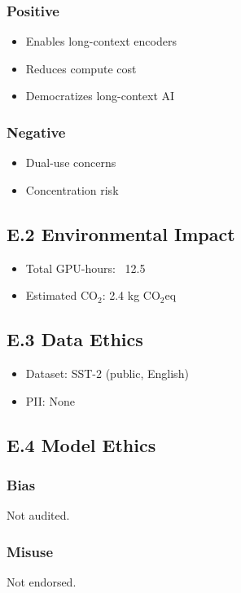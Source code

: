 \subsubsection{Positive}
\begin{itemize}
\item Enables long-context encoders
\item Reduces compute cost
\item Democratizes long-context AI

\end{itemize}
\subsubsection{Negative}
\begin{itemize}
\item Dual-use concerns
\item Concentration risk

\end{itemize}
\subsection{E.2 Environmental Impact}

\begin{itemize}
\item Total GPU-hours: ~12.5
\item Estimated CO$_2$: 2.4 kg CO$_2$eq

\end{itemize}
\subsection{E.3 Data Ethics}

\begin{itemize}
\item Dataset: SST-2 (public, English)
\item PII: None

\end{itemize}
\subsection{E.4 Model Ethics}

\subsubsection{Bias}
Not audited.

\subsubsection{Misuse}
Not endorsed.

